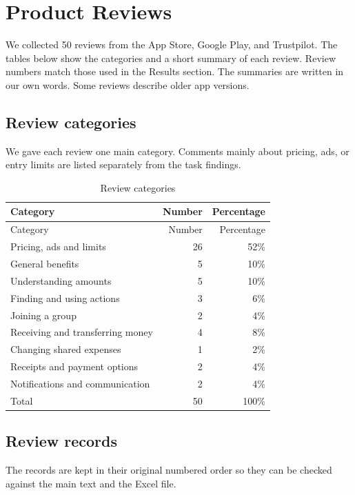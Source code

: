 \section{Product Reviews}
\label{app:reviews}
We collected 50 reviews from the App Store, Google Play, and Trustpilot. The tables below show the categories and a short summary of each review. Review numbers match those used in the Results section. The summaries are written in our own words. Some reviews describe older app versions.

\subsection{Review categories}
We gave each review one main category. Comments mainly about pricing, ads, or entry limits are listed separately from the task findings.

\begin{longtable}{@{}>{\raggedright\arraybackslash}p{3.8in}rr@{}}
\caption{Review categories}\label{tab:categories}\\
\toprule Category & Number & Percentage \\ \midrule
\endfirsthead
\toprule Category & Number & Percentage \\ \midrule
\endhead
\bottomrule\endfoot
Pricing, ads and limits & 26 & 52\% \\
General benefits & 5 & 10\% \\
Understanding amounts & 5 & 10\% \\
Finding and using actions & 3 & 6\% \\
Joining a group & 2 & 4\% \\
Receiving and transferring money & 4 & 8\% \\
Changing shared expenses & 1 & 2\% \\
Receipts and payment options & 2 & 4\% \\
Notifications and communication & 2 & 4\% \\
\midrule
Total & 50 & 100\% \\
\end{longtable}

\subsection{Review records}
The records are kept in their original numbered order so they can be checked against the main text and the Excel file.

